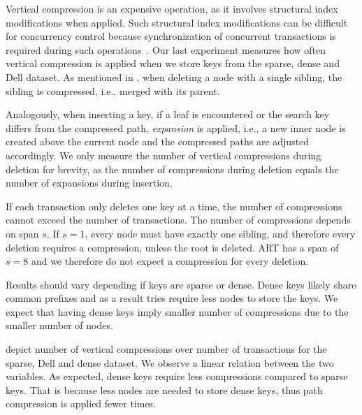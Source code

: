 \documentclass[abstracton,12pt]{scrartcl}
\theoremstyle{definition}
\begin{document}
Vertical compression is an expensive operation, as it involves structural index
modifications when applied. Such structural index modifications can be
difficult for concurrency control because synchronization of concurrent
transactions is required during such operations~\cite{wellenzohn2017wapi}.
Our last experiment measures how often vertical compression is applied
when we store keys from the sparse, dense and Dell dataset.
As mentioned in , when deleting a node with
a single sibling, the sibling is compressed, i.e., merged with its parent.

Analogously, when inserting a key, if a leaf is encountered or the search key
differs from the compressed path, \textit{expansion} is applied, i.e., a new 
inner node is created above the current node and the compressed paths are 
adjusted accordingly. We only measure the number of vertical compressions during
deletion for brevity, as the number of compressions during deletion equals the 
number of expansions during insertion.

If each transaction only deletes one key at a time, the number of compressions
cannot exceed the number of transactions. The number of compressions
depends on span $s$. If $s=1$, every node must have exactly one sibling,
and therefore every deletion requires a compression, unless the root is
deleted. ART has a span of $s=8$ and we therefore do not expect a compression 
for every deletion.

Results should vary depending if keys are sparse or dense. Dense keys
likely share common prefixes and as a result tries require less nodes to 
store the keys. We expect that having dense keys imply smaller number
of compressions due to the smaller number of nodes.

depict number of vertical
compressions over number of transactions for the sparse, Dell and dense 
dataset. We observe a linear relation between the two variables. As expected,
dense keys require less compressions compared to sparse keys. That is because 
less nodes are needed to store dense keys, thus path compression is applied
fewer times.
\end{document}
